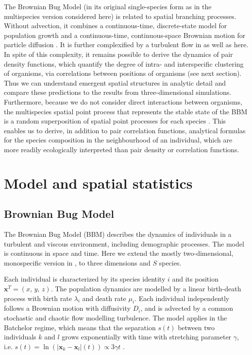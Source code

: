 \documentclass[12pt,english]{article}
\newcommand{\bx}{\boldsymbol{x}}
\begin{document}
The Brownian Bug Model (in its original single-species form as in
the multispecies version considered here) is related to spatial branching
processes. Without advection, it combines a continuous-time, discrete-state
model for population growth and a continuous-time, continuous-space
Brownian motion for particle diffusion \citep{birch_master_2006}.
It is further complexified by a turbulent flow in \citet{young_reproductive_2001,picoche_rescience_2022}
as well as here. In spite of this complexity, it remains possible
to derive the dynamics of pair density functions, which quantify the
degree of intra- and interspecific clustering of organisms, via correlations
between positions of organisms (see next section). Thus we can understand
emergent spatial structures in analytic detail and compare these predictions to the results from three-dimensional simulations. Furthermore, because we do not consider direct interactions between organisms, the multispecies spatial point process that represents the stable state of the BBM is a random superposition of spatial point processes for each species
\citep{illian2008statistical}. This enables us to derive, in addition
to pair correlation functions, analytical formulas for the species
composition in the neighbourhood of an individual, which are more
readily ecologically interpreted than pair density or correlation
functions.

\section*{Model and spatial statistics}

\subsection*{Brownian Bug Model}

The Brownian Bug Model (BBM) describes the dynamics of individuals
in a turbulent and viscous environment, including demographic processes.
The model is continuous in space and time. Here we extend the mostly
two-dimensional, monospecific version in \citet{young_reproductive_2001},
to three dimensions and $S$ species.

Each individual is characterized by its species identity $i$ and
its position $\mathbf{x}^{T}=(x,\,y,\,z)$. The population dynamics
are modelled by a linear birth-death process with birth rate $\lambda_{i}$
and death rate $\mu_{i}$. Each individual independently follows a
Brownian motion with diffusivity $D_{i}$, and is advected by a common
stochastic and chaotic flow modelling turbulence. The model applies
in the Batchelor regime, which means that the separation $s(t)$ between
two individuals $k$ and $l$ grows exponentially with time with stretching
parameter $\gamma$, i.e. $s(t)=\ln\left(|\bx_{k}-\bx_{l}|(t)\right)\propto3\gamma t$
\citep{kraichnan_convection_1974,young_reproductive_2001}.
\end{document}
